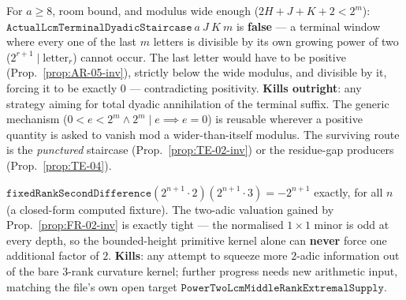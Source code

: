 \begin{obs}\label{prop:TE-01-killer}
For $a\ge8$, room bound, and modulus wide enough ($2H{+}J{+}K{+}2<2^m$):
$\mathtt{ActualLcmTerminalDyadicStaircase}\ a\ J\ K\ m$ is \textbf{false} — a terminal window
where every one of the last $m$ letters is divisible by its own growing power of two
($2^{r+1}\mid\text{letter}_r$) cannot occur. The last letter would have to be positive
(Prop.~\ref{prop:AR-05-inv}), strictly below the wide modulus, and divisible by it, forcing it to
be exactly $0$ — contradicting positivity. \textbf{Kills outright}: any strategy aiming for total
dyadic annihilation of the terminal suffix. The generic mechanism
($0<e<2^m\wedge2^m\mid e\implies e=0$) is reusable wherever a positive quantity is asked to vanish
mod a wider-than-itself modulus. The surviving route is the \emph{punctured} staircase
(Prop.~\ref{prop:TE-02-inv}) or the residue-gap producers (Prop.~\ref{prop:TE-04}).
\ \ \\
\end{obs}

\begin{obs}\label{prop:FR-03-kill}
$\mathtt{fixedRankSecondDifference}(2^{n+1}\cdot2)(2^{n+1}\cdot3) = -2^{n+1}$ exactly, for all $n$
(a closed-form computed fixture). The two-adic valuation gained by Prop.~\ref{prop:FR-02-inv} is
exactly tight — the normalised $1{\times}1$ minor is odd at every depth, so the bounded-height
primitive kernel alone can \textbf{never} force one additional factor of $2$. \textbf{Kills}: any
attempt to squeeze more $2$-adic information out of the bare 3-rank curvature kernel; further
progress needs new arithmetic input, matching the file's own open target
$\mathtt{PowerTwoLcmMiddleRankExtremalSupply}$.
\ \ \\
\end{obs}

